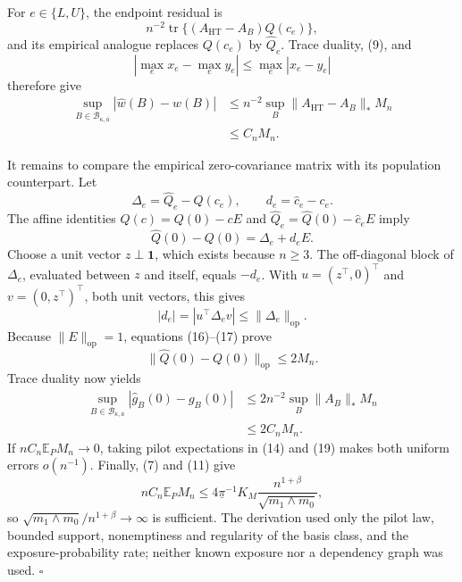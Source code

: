 For \(e\in\{L,U\}\), the endpoint residual is
\[
n^{-2}\operatorname{tr}\{(A_{\mathrm{HT}}-A_B)Q(c_e)\},
\tag{12}
\]
and its empirical analogue replaces \(Q(c_e)\) by \(\widehat Q_e\).  Trace duality, (9), and
\[
|\max_e x_e-\max_e y_e|\le\max_e|x_e-y_e|
\tag{13}
\]
therefore give
\[
\begin{aligned}
\sup_{B\in\mathcal B_{\kappa,\overline a}}
|\widehat w(B)-w(B)|
&\le n^{-2}\sup_B
\|A_{\mathrm{HT}}-A_B\|_*M_n\\
&\le C_nM_n.
\end{aligned}
\tag{14}
\]

It remains to compare the empirical zero-covariance matrix with its population counterpart.  Let
\[
\Delta_e=\widehat Q_e-Q(c_e),
\qquad
d_e=\widehat c_e-c_e.
\tag{15}
\]
The affine identities \(Q(c)=Q(0)-cE\) and \(\widehat Q_e=\widehat Q(0)-\widehat c_eE\) imply
\[
\widehat Q(0)-Q(0)=\Delta_e+d_eE.
\tag{16}
\]
Choose a unit vector \(z\perp\mathbf1\), which exists because \(n\ge3\).  The off-diagonal block of \(\Delta_e\), evaluated between \(z\) and itself, equals \(-d_e\).  With \(u=(z^{\top},0)^{\top}\) and \(v=(0,z^{\top})^{\top}\), both unit vectors, this gives
\[
|d_e|=|u^{\top}\Delta_ev|
\le\|\Delta_e\|_{\mathrm{op}}.
\tag{17}
\]
Because \(\|E\|_{\mathrm{op}}=1\), equations (16)--(17) prove
\[
\|\widehat Q(0)-Q(0)\|_{\mathrm{op}}
\le2M_n.
\tag{18}
\]
Trace duality now yields
\[
\begin{aligned}
\sup_{B\in\mathcal B_{\kappa,\overline a}}
|\widehat g_B(0)-g_B(0)|
&\le2n^{-2}\sup_B\|A_B\|_*M_n\\
&\le2C_nM_n.
\end{aligned}
\tag{19}
\]
If \(nC_n\mathbb E_PM_n\to0\), taking pilot expectations in (14) and (19) makes both uniform errors \(o(n^{-1})\).  Finally, (7) and (11) give
\[
nC_n\mathbb E_PM_n
\le4\underline\pi^{-1}K_M
\frac{n^{1+\beta}}{\sqrt{m_1\wedge m_0}},
\tag{20}
\]
so \(\sqrt{m_1\wedge m_0}/n^{1+\beta}\to\infty\) is sufficient.  The derivation used only the pilot law, bounded support, nonemptiness and regularity of the basis class, and the exposure-probability rate; neither known exposure nor a dependency graph was used. \(\square\)